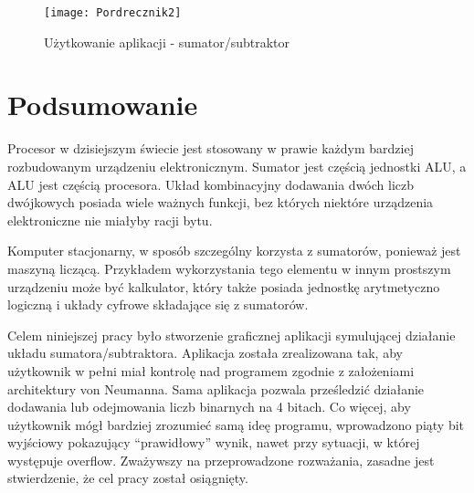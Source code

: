 \documentclass[12pt, a4paper, onside, polish]{article}				%
\begin{document}
   	\begin{figure}[H]
  	  {\centering \texttt{[image: Pordrecznik2]} \caption{Użytkowanie aplikacji - sumator/subtraktor}}\vspace{5mm}
  	 \end{figure}

\cleardoublepage




\section{Podsumowanie}
\hspace{\parindent}
Procesor w dzisiejszym świecie jest stosowany w prawie każdym bardziej rozbudowanym urządzeniu elektronicznym. Sumator jest częścią jednostki ALU, a ALU jest częścią procesora. Układ kombinacyjny dodawania dwóch liczb dwójkowych posiada wiele ważnych funkcji, bez których niektóre urządzenia elektroniczne nie miałyby racji bytu.

Komputer stacjonarny, w sposób szczególny korzysta z sumatorów, ponieważ jest maszyną liczącą. Przykładem wykorzystania tego elementu w innym prostszym urządzeniu może być kalkulator, który także posiada jednostkę arytmetyczno logiczną i układy cyfrowe składające się z sumatorów.

Celem niniejszej pracy było stworzenie graficznej aplikacji symulującej działanie układu sumatora/subtraktora. Aplikacja została zrealizowana tak, aby użytkownik w pełni miał kontrolę nad programem zgodnie z założeniami architektury von Neumanna. Sama aplikacja pozwala prześledzić działanie dodawania lub odejmowania liczb binarnych na 4 bitach. Co więcej, aby użytkownik mógł bardziej zrozumieć samą ideę programu, wprowadzono piąty bit wyjściowy pokazujący “prawidłowy” wynik, nawet przy sytuacji, w której występuje overflow. Zważywszy na przeprowadzone rozważania, zasadne jest stwierdzenie, że cel pracy został osiągnięty.

\cleardoublepage
\end{document}
